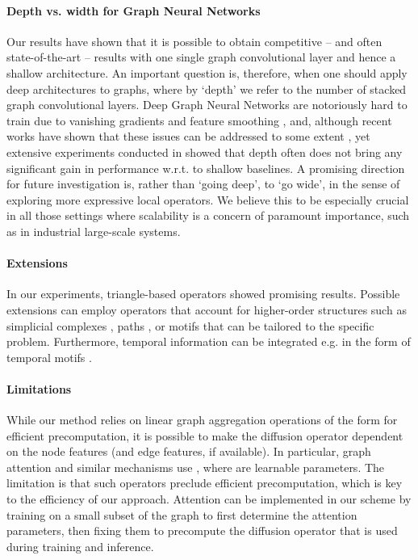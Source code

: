 \documentclass{article}
\begin{document}
\paragraph{Depth vs. width for Graph Neural Networks}
Our results have shown that it is possible to obtain competitive -- and often state-of-the-art -- results with one single graph convolutional layer and hence a shallow architecture. An important question is, therefore, when one should apply deep architectures to graphs, where by `depth' we refer to the number of stacked graph convolutional layers.
Deep Graph Neural Networks are notoriously hard to train due to vanishing gradients and feature smoothing \cite{li2018adaptive,klicpera2018predict,wu2020comprehensive}, and, although recent works have shown that these issues can be addressed to some extent \cite{jk,gong2020geometrically, li2019deepgcns, zhao2019pairnorm, rong2019dropedge}, yet extensive experiments conducted in \cite{rong2019dropedge} showed that depth often does not bring any significant gain in performance w.r.t. to shallow baselines.
A promising direction for future investigation is, rather than `going deep', to `go wide', in the sense of exploring more expressive local operators. We believe this to be especially crucial in all those settings where scalability is a concern of paramount importance, such as in industrial large-scale systems.

\paragraph{Extensions}
In our experiments, triangle-based operators showed promising results. Possible extensions can employ operators that account for higher-order structures such as simplicial complexes \cite{barbarossa2019topological}, paths \cite{flam2020neural}, or motifs \cite{monti2018motifnet} that can be tailored to the specific problem. 
Furthermore, temporal information can be integrated e.g. in the form of temporal motifs \cite{paranjape2017motifs}. 

\paragraph{Limitations}
While our method relies on linear graph aggregation operations of the form  for efficient precomputation, it is possible to make the diffusion operator dependent on the node features (and edge features, if available). 
In particular, graph attention \cite{DBLP:conf/iclr/VelickovicCCRLB18} and similar mechanisms \cite{Monti2016GeometricDL} use , where  are learnable parameters. The limitation is that such operators preclude efficient precomputation, which is key to the efficiency of our approach. 
Attention can be implemented in our scheme by training on a small subset of the graph to first determine the attention parameters, then fixing them to precompute the diffusion operator that is used during training and inference.  
\end{document}
